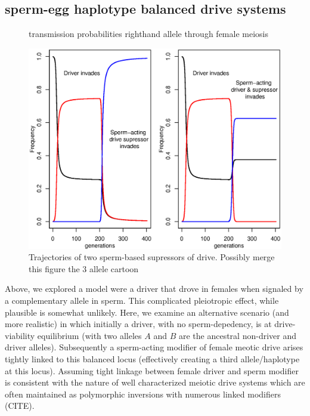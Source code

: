 \documentclass[12pt,letterpaper]{article}
\begin{document}
\subsection*{ sperm-egg haplotype balanced drive systems}

\begin{figure}
\caption{transmission probabilities righthand allele through female
  meiosis}  \label{Eggsperm_3_allele_cartoon}
\end{figure}


\begin{figure}
\includegraphics[width = 0.8 \textwidth]{Figures/trajectories_of_sperm_based_supressors.eps} 
\caption{Trajectories of two sperm-based supressors of drive. Possibly
merge this figure the 3 allele cartoon}  \label{Trajectories_of_supressors}
\end{figure}

Above, we explored a model were a driver that drove in females when signaled by a complementary allele in sperm.  
This complicated pleiotropic effect, while plausible is somewhat unlikely. 
Here, we examine an alternative scenario (and more realistic) in which
initially a driver, with no sperm-depedency, is at drive-viability equilibrium (with two alleles
$A$ and $B$ are the ancestral non-driver and driver alleles).
Subsequently a sperm-acting modifier of female meotic drive arises tightly
        linked to this balanced locus (effectively creating a third
        allele/haplotype at this locus).
Assuming tight linkage between female driver and sperm modifier is consistent with the nature of well characterized meiotic drive systems 
	which are often maintained as polymorphic inversions with numerous linked modifiers (CITE).
\end{document}

